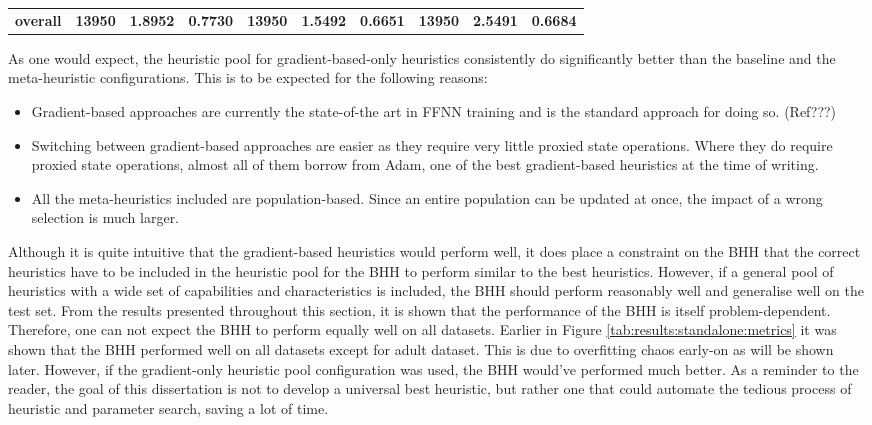\begin{table}[htbp]
{\begin{tabular}{rccccccccc}
                  \midrule
                  \textbf{overall}                    & \textbf{13950}                     & \textbf{1.8952}                                                           & \textbf{0.7730} & \textbf{13950} & \cellcolor[rgb]{ .776,  .937,  .808}\textcolor[rgb]{ 0,  .38,  0}{\textbf{1.5492}} & \textbf{0.6651} & \textbf{13950} & \textbf{2.5491} & \textbf{0.6684} \\
            \end{tabular}%
      }
\end{table}%

As one would expect, the heuristic pool for gradient-based-only heuristics consistently do significantly better than the baseline and the meta-heuristic configurations. This is to be expected for the following reasons:

\begin{itemize}
      \item Gradient-based approaches are currently the state-of-the art in \Ac{FFNN} training and is the standard approach for doing so. (Ref???)

      \item Switching between gradient-based approaches are easier as they require very little proxied state operations. Where they do require proxied state operations, almost all of them borrow from \Ac{Adam}, one of the best gradient-based heuristics at the time of writing.

      \item All the meta-heuristics included are population-based. Since an entire population can be updated at once, the impact of a wrong selection is much larger.
\end{itemize}

Although it is quite intuitive that the gradient-based heuristics would perform well, it does place a constraint on the \Ac{BHH} that the correct heuristics have to be included in the heuristic pool for the \Ac{BHH} to perform similar to the best heuristics. However, if a general pool of heuristics with a wide set of capabilities and characteristics is included, the \Ac{BHH} should perform reasonably well and generalise well on the test set. From the results presented throughout this section, it is shown that the performance of the \Ac{BHH} is itself problem-dependent. Therefore, one can not expect the \Ac{BHH} to perform equally well on all datasets. Earlier in Figure \ref{tab:results:standalone:metrics} it was shown that the \Ac{BHH} performed well on all datasets except for adult dataset. This is due to overfitting chaos early-on as will be shown later. However, if the gradient-only heuristic pool configuration was used, the \Ac{BHH} would've performed much better. As a reminder to the reader, the goal of this dissertation is not to develop a universal best heuristic, but rather one that could automate the tedious process of heuristic and parameter search, saving a lot of time.

